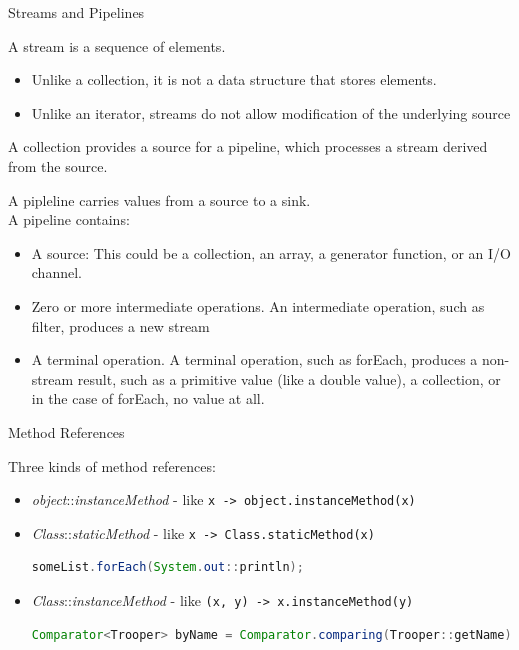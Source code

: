 \documentclass{beamer}
\begin{document}
\begin{frame}[fragile]{Streams and Pipelines}

A stream is a sequence of elements.
\begin{itemize}
\item Unlike a collection, it is not a data structure that stores elements.
\item Unlike an iterator, streams do not allow modification of the underlying source
\end{itemize}

A collection provides a source for a pipeline, which processes a stream derived from the source.

\vspace{.1in}
A pipleline carries values from a source to a sink.\\
A pipeline contains:

\begin{itemize}
\item A source: This could be a collection, an array, a generator function, or an I/O channel.
\item Zero or more intermediate operations. An intermediate operation, such as filter, produces a new stream
\item A terminal operation. A terminal operation, such as forEach, produces a non-stream result, such as a primitive value (like a double value), a collection, or in the case of forEach, no value at all.
\end{itemize}

\end{frame}

\begin{frame}[fragile]{Method References}

Three kinds of method references:
\begin{itemize}
\item {\it object}::{\it instanceMethod} - like {\tt x -> object.instanceMethod(x)}

\item {\it Class}::{\it staticMethod} - like {\tt x -> Class.staticMethod(x)}
\begin{lstlisting}[language=Java]
someList.forEach(System.out::println);
\end{lstlisting}

\item {\it Class}::{\it instanceMethod} - like {\tt (x, y) -> x.instanceMethod(y)}
\begin{lstlisting}[language=Java]
Comparator<Trooper> byName = Comparator.comparing(Trooper::getName);
\end{lstlisting}

\end{itemize}


\end{frame}
\end{document}
